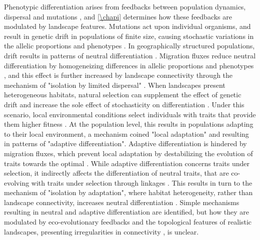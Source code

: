 Phenotypic differentiation arises from feedbacks between population dynamics, dispersal and mutations \citep{hamilton2021population}, and \cref{\chapi} determines how these feedbacks are modulated by landscape features.
% 
Mutations act upon individual organisms, and result in genetic drift in populations of finite size, causing stochastic variations in the allelic proportions and phenotypes \citep{Slatkin1987a}. 
% 
In geographically structured populations, drift results in patterns of neutral differentiation \citep{Slatkin1987a}.%
% 
Migration fluxes reduce neutral differentiation by homogeneizing differences in allelic proportions and phenotypes \citep{Slatkin1987a}, and this effect is further increased by landscape connectivity \citep{Wright1943,McRae2006,McRae2007} through the mechanism of "isolation by limited dispersal" \citep{Lande1991,Orsini2013}.
% 
When landscapes present heterogeneous habitats, natural selection can supplement the effect of genetic drift and increase the sole effect of stochasticity on differentiation \citep{fisher1958genetical}. Under this scenario, local environmental conditions select individuals with traits that provide them higher fitness \citep{Gaither2018}. At the population level, this results in populations adapting to their local environment, a mechanism coined "local adaptation" \citep{Kawecki2004} and resulting in patterns of "adaptive differentiation". 
% 
Adaptive differentiation is hindered by migration fluxes, which prevent local adaptation by destabilizing the evolution of traits towards the optimal \citep{Meszena1997,Debarre2013,Mirrahimi2020}.
% 
While adaptive differentiation concerns traits under selection, it indirectly affects the differentiation of neutral traits, that are co-evolving with traits under selection through linkages \citep{Billiard2015,Lepers2021}. This results in turn to the mechanism of "isolation by adaptation", where habitat heterogeneity, rather than landscape connectivity, increases neutral differentiation \citep{nosil2008}. 
% 
Simple mechanisms resulting in neutral and adaptive differentiation are identified, but how they are modulated by eco-evolutionary feedbacks and the topological features of realistic landscapes, presenting irregularities in connectivity \citep{Dale2010,LiebermanHauert2005}, is unclear. %

